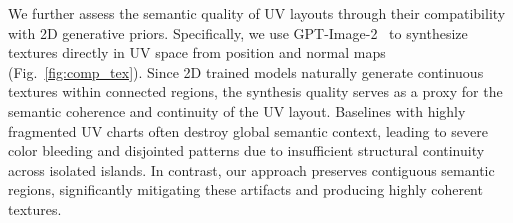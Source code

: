 We further assess the semantic quality of UV layouts through their compatibility with 2D generative priors. Specifically, we use GPT-Image-2~\cite{openai2026gptimage2} to synthesize textures directly in UV space from position and normal maps (Fig.~\ref{fig:comp_tex}). Since 2D trained models naturally generate continuous textures within connected regions, the synthesis quality serves as a proxy for the semantic coherence and continuity of the UV layout.
%
Baselines with highly fragmented UV charts often destroy global semantic context, leading to severe color bleeding and disjointed patterns due to insufficient structural continuity across isolated islands.
%
In contrast, our approach preserves contiguous semantic regions, significantly mitigating these artifacts and producing highly coherent textures.

%



